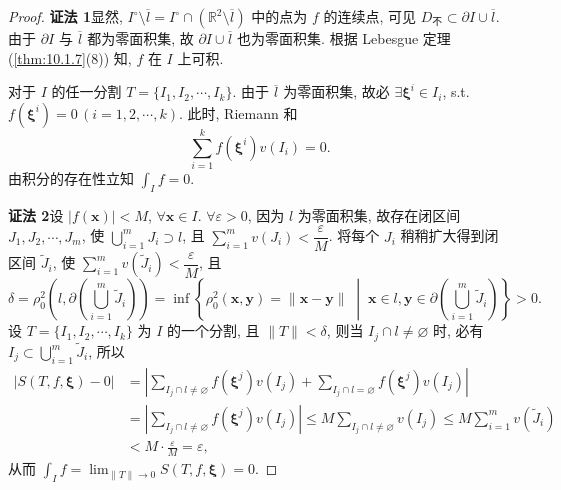 \begin{proof}
\textbf{证法 1}\quad 显然, $I^{\circ} \setminus \overline{l} = I^{\circ} \cap (\mathbb{R}^{2} \setminus \overline{l})$ 中的点为 $f$ 的连续点, 可见 $D_{\text{不}} \subset \partial I \cup \overline{l}$. 由于 $\partial I$ 与 $\overline{l}$ 都为零面积集, 故 $\partial I \cup \overline{l}$ 也为零面积集. 根据 Lebesgue 定理 (\cref{thm:10.1.7}(8)) 知, $f$ 在 $I$ 上可积.

对于 $I$ 的任一分割 $T = \{I_{1}, I_{2}, \cdots, I_{k}\}$. 由于 $\overline{l}$ 为零面积集, 故必 $\exists \boldsymbol{\xi}^{i} \in I_{i}$, s.t. $f(\boldsymbol{\xi}^{i}) = 0\,(i = 1, 2, \cdots, k)$. 此时, Riemann 和
\[
  \sum_{i=1}^{k} f(\boldsymbol{\xi}^{i}) v(I_{i}) = 0.
\]
由积分的存在性立知 $\displaystyle\int_{I} f = 0$.

\textbf{证法 2}\quad 设 $|f(\boldsymbol{x})| < M$, $\forall \boldsymbol{x} \in I$. $\forall \varepsilon > 0$, 因为 $l$ 为零面积集, 故存在闭区间 $J_{1}, J_{2}, \cdots, J_{m}$, 使 $\bigcup\limits_{i=1}^{m} J_{i} \supset l$, 且 $\sum\limits_{i=1}^{m} v(J_{i}) < \dfrac{\varepsilon}{M}$. 将每个 $J_{i}$ 稍稍扩大得到闭区间 $\widetilde{J}_{i}$, 使 $\sum\limits_{i=1}^{m} v(\widetilde{J}_{i}) < \dfrac{\varepsilon}{M}$, 且
\[
  \delta = \rho_{0}^{2}\left(l, \partial\left(\bigcup_{i=1}^{m}\widetilde{J}_{i}\right)\right) = \inf\left\{\rho_{0}^{2}(\boldsymbol{x}, \boldsymbol{y}) = \|\boldsymbol{x} - \boldsymbol{y}\| \;\middle|\; \boldsymbol{x} \in l, \boldsymbol{y} \in \partial\left(\bigcup_{i=1}^{m}\widetilde{J}_{i}\right)\right\} > 0.
\]
设 $T = \{I_{1}, I_{2}, \cdots, I_{k}\}$ 为 $I$ 的一个分割, 且 $\|T\| < \delta$, 则当 $I_{j} \cap l \neq \varnothing$ 时, 必有 $I_{j} \subset \bigcup\limits_{i=1}^{m} \widetilde{J}_{i}$, 所以
\begin{align*}
  |S(T, f, \boldsymbol{\xi}) - 0| &= \left|\sum_{I_{j} \cap l \neq \varnothing} f(\boldsymbol{\xi}^{j}) v(I_{j}) + \sum_{I_{j} \cap l = \varnothing} f(\boldsymbol{\xi}^{j}) v(I_{j})\right| \\
  &= \left|\sum_{I_{j} \cap l \neq \varnothing} f(\boldsymbol{\xi}^{j}) v(I_{j})\right| \leqslant M \sum_{I_{j} \cap l \neq \varnothing} v(I_{j}) \leqslant M \sum_{i=1}^{m} v(\widetilde{J}_{i}) \\
  &< M \cdot \frac{\varepsilon}{M} = \varepsilon,
\end{align*}
从而 $\displaystyle\int_{I} f = \lim_{\|T\| \to 0} S(T, f, \boldsymbol{\xi}) = 0$.
\end{proof}

